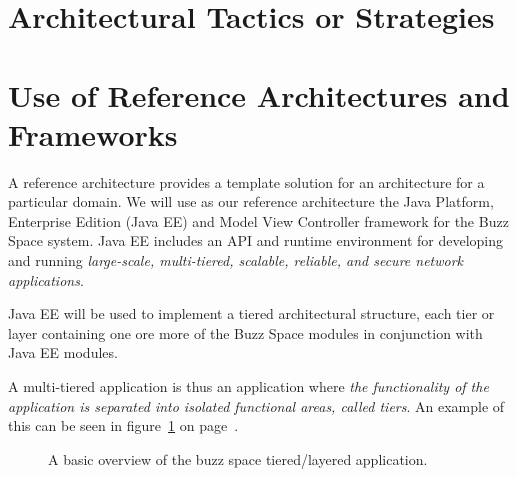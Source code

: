 \documentclass[a4paper,12pt,titlepage]{article}
\begin{document}
\section{Architectural Tactics or Strategies}%
\newpage
\section{Use of Reference Architectures and Frameworks}%
A reference architecture provides a template solution for an architecture for a particular domain. We will use as our reference architecture the Java Platform, Enterprise Edition (Java EE) and Model View Controller framework for the Buzz Space system. 
Java EE includes an API and runtime environment for developing and running \textit{large-scale, multi-tiered, scalable, reliable, and secure network applications}.

Java EE will be used to implement a tiered architectural structure, each tier or layer containing one ore more of the Buzz Space modules in conjunction with Java EE modules. 

A multi-tiered application is thus an application where \textit{the functionality of the application is separated into isolated functional areas, called tiers}. An example of this can be seen in figure~\ref{fig:refarchandmvc} on page~\pageref{fig:refarchandmvc}.
\begin{figure}[H]
	\centering
	\caption{A basic overview of the buzz space tiered/layered application.}
	\label{fig:refarchandmvc}
\end{figure}
\newpage
\end{document}
